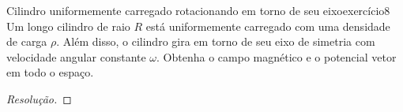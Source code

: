 \begin{exercício}{Cilindro uniformemente carregado rotacionando em torno de seu eixo}{exercício8}
    Um longo cilindro de raio \(R\) está uniformemente carregado com uma densidade de carga \(\rho\). Além disso, o cilindro gira em torno de seu eixo de simetria com velocidade angular constante \(\omega\). Obtenha o campo magnético e o potencial vetor em todo o espaço.
\end{exercício}
\begin{proof}[Resolução]

\end{proof}
